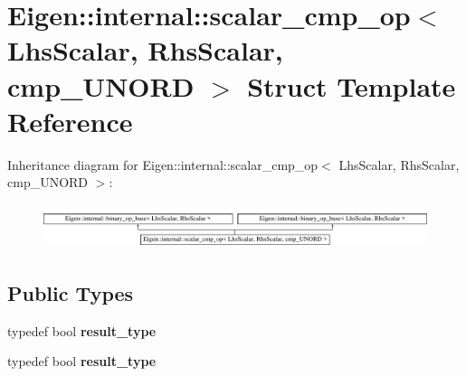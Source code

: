 \hypertarget{struct_eigen_1_1internal_1_1scalar__cmp__op_3_01_lhs_scalar_00_01_rhs_scalar_00_01cmp___u_n_o_r_d_01_4}{}\section{Eigen\+:\+:internal\+:\+:scalar\+\_\+cmp\+\_\+op$<$ Lhs\+Scalar, Rhs\+Scalar, cmp\+\_\+\+U\+N\+O\+RD $>$ Struct Template Reference}
\label{struct_eigen_1_1internal_1_1scalar__cmp__op_3_01_lhs_scalar_00_01_rhs_scalar_00_01cmp___u_n_o_r_d_01_4}
Inheritance diagram for Eigen\+:\+:internal\+:\+:scalar\+\_\+cmp\+\_\+op$<$ Lhs\+Scalar, Rhs\+Scalar, cmp\+\_\+\+U\+N\+O\+RD $>$\+:\begin{figure}[H]
\begin{center}
\leavevmode
\includegraphics[height=1.323877cm]{struct_eigen_1_1internal_1_1scalar__cmp__op_3_01_lhs_scalar_00_01_rhs_scalar_00_01cmp___u_n_o_r_d_01_4}
\end{center}
\end{figure}
\subsection*{Public Types}
\begin{DoxyCompactItemize}
\item 
\mbox{\label{struct_eigen_1_1internal_1_1scalar__cmp__op_3_01_lhs_scalar_00_01_rhs_scalar_00_01cmp___u_n_o_r_d_01_4_ae511083326de74bcd53a5cd609f43532}} 
typedef bool {\bfseries result\+\_\+type}
\item 
\mbox{\label{struct_eigen_1_1internal_1_1scalar__cmp__op_3_01_lhs_scalar_00_01_rhs_scalar_00_01cmp___u_n_o_r_d_01_4_ae511083326de74bcd53a5cd609f43532}} 
typedef bool {\bfseries result\+\_\+type}
\end{DoxyCompactItemize}
